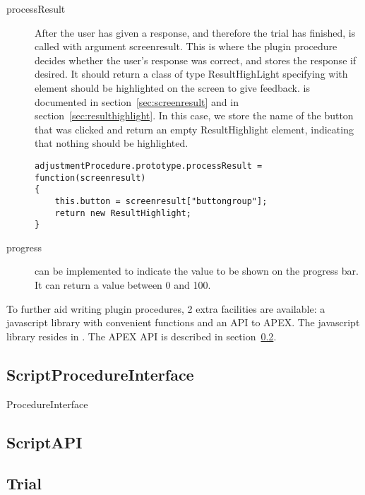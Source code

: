 \begin{description}
\item[processResult] After the user has given a response, and therefore the trial has finished,  is called with argument screenresult. This is where the plugin procedure decides whether the user's response was correct, and stores the response if desired. It should return a class of type ResultHighLight specifying with element should be highlighted on the screen to give feedback.  is documented in section~\ref{sec:screenresult} and   in section~\ref{sec:resulthighlight}. In this case, we store the name of the button that was clicked and return an empty ResultHighlight element, indicating that nothing should be highlighted.
\begin{lstlisting}
adjustmentProcedure.prototype.processResult = function(screenresult)
{
    this.button = screenresult["buttongroup"];
    return new ResultHighlight;
}
\end{lstlisting}

\item[progress] can be implemented to indicate the value to be shown on the progress bar. It can return a value between 0 and 100.
\end{description}



To further aid writing plugin procedures, 2 extra facilities are available: a javascript library with convenient functions and an API to APEX. The javascript library resides in . The APEX API is described in section~\ref{sec:scriptapi}.




\subsection{ScriptProcedureInterface}
\label{sec:scriptprocedureinterface}

ProcedureInterface


\subsection{ScriptAPI}
\label{sec:scriptapi}



\subsection{Trial}
\label{sec:trial}

